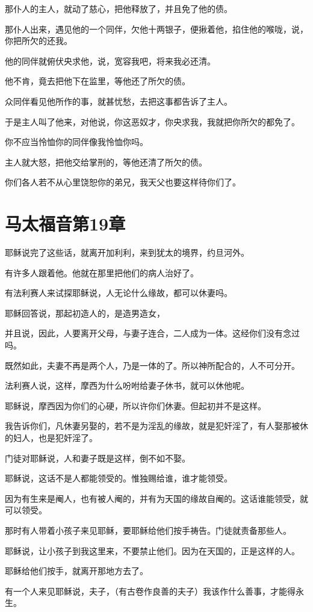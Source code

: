\documentclass[12pt,oneside]{book}
\begin{document}
那仆人的主人，就动了慈心，把他释放了，并且免了他的债。

那仆人出来，遇见他的一个同伴，欠他十两银子，便揪着他，掐住他的喉咙，说，你把所欠的还我。

他的同伴就俯伏央求他，说，宽容我吧，将来我必还清。

他不肯，竟去把他下在监里，等他还了所欠的债。

众同伴看见他所作的事，就甚忧愁，去把这事都告诉了主人。

于是主人叫了他来，对他说，你这恶奴才，你央求我，我就把你所欠的都免了。

你不应当怜恤你的同伴像我怜恤你吗。

主人就大怒，把他交给掌刑的，等他还清了所欠的债。

你们各人若不从心里饶恕你的弟兄，我天父也要这样待你们了。

\chapter{马太福音第19章}
耶稣说完了这些话，就离开加利利，来到犹太的境界，约旦河外。

有许多人跟着他。他就在那里把他们的病人治好了。

有法利赛人来试探耶稣说，人无论什么缘故，都可以休妻吗。

耶稣回答说，那起初造人的，是造男造女，

并且说，因此，人要离开父母，与妻子连合，二人成为一体。这经你们没有念过吗。

既然如此，夫妻不再是两个人，乃是一体的了。所以神所配合的，人不可分开。

法利赛人说，这样，摩西为什么吩咐给妻子休书，就可以休他呢。

耶稣说，摩西因为你们的心硬，所以许你们休妻。但起初并不是这样。

我告诉你们，凡休妻另娶的，若不是为淫乱的缘故，就是犯奸淫了，有人娶那被休的妇人，也是犯奸淫了。

门徒对耶稣说，人和妻子既是这样，倒不如不娶。

耶稣说，这话不是人都能领受的。惟独赐给谁，谁才能领受。

因为有生来是阉人，也有被人阉的，并有为天国的缘故自阉的。这话谁能领受，就可以领受。

那时有人带着小孩子来见耶稣，要耶稣给他们按手祷告。门徒就责备那些人。

耶稣说，让小孩子到我这里来，不要禁止他们。因为在天国的，正是这样的人。

耶稣给他们按手，就离开那地方去了。

有一个人来见耶稣说，夫子，（有古卷作良善的夫子）我该作什么善事，才能得永生。
\end{document}
